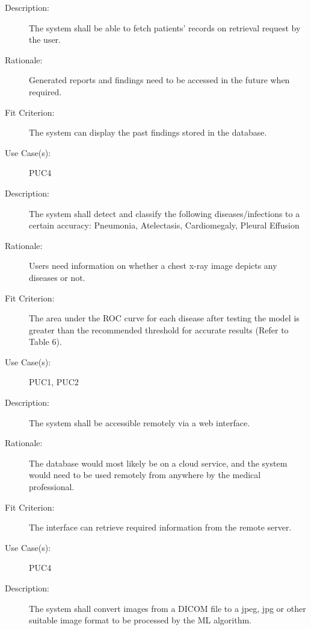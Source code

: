 \documentclass[12pt]{article}
\begin{document}
\begin{enumerate}[label=FR\arabic*., series=frs]
\begin{item}
\begin{description}
            
            \item[Description:] The system shall be able to fetch patients’ records on retrieval request by the user.
            \item[Rationale:] Generated reports and findings need to be accessed in the future when required.
            \item[Fit Criterion:] The system can display the past findings stored in the database.
            \item[Use Case(s):] PUC4
        \end{description}
    \end{item}
    \begin{item}
        \begin{description}
            \item[Description:] \hypertarget{FR5}{The system shall detect and classify the following diseases/infections to a certain accuracy: Pneumonia, Atelectasis, Cardiomegaly, Pleural Effusion}
            \item[Rationale:] Users need information on whether a chest x-ray image depicts any diseases or not.
            \item[Fit Criterion:] The area under the ROC curve for each disease after testing the model is greater than the recommended threshold for accurate results (Refer to Table 6). 
            \item[Use Case(s):] PUC1, PUC2
        \end{description}
    \end{item}
    \begin{item}
        \begin{description}
            \item[Description:] The system shall be accessible remotely via a web interface.
            \item[Rationale:] The database would most likely be on a cloud service, and the system would need to be used remotely from anywhere by the medical professional.
            \item[Fit Criterion:] The interface can retrieve required information from the remote server.
            \item[Use Case(s):] PUC4
        \end{description}
    \end{item}
    \begin{item}
        \begin{description}
            \item[Description:] The system shall convert images from a DICOM file to a jpeg, jpg or other suitable image format to be processed by the ML algorithm.

\end{description}
\end{item}
\end{enumerate}
\end{document}
